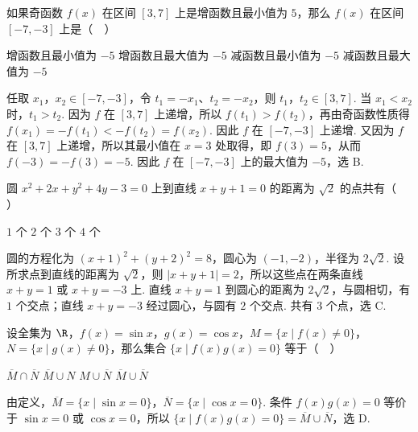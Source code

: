 \begin{problem}
如果奇函数 \(f(x)\) 在区间 \([3,7]\) 上是增函数且最小值为 \(5\)，那么 \(f(x)\) 在区间 \([-7,-3]\) 上是（\(\quad\)）

\choices
    {增函数且最小值为 \(-5\)}
    {增函数且最大值为 \(-5\)}
    {减函数且最小值为 \(-5\)}
    {减函数且最大值为 \(-5\)}


\begin{solution}
任取 \(x_1\)，\(x_2\in[-7,-3]\)，令 \(t_1=-x_1\)、\(t_2=-x_2\)，则 \(t_1\)，\(t_2\in[3,7]\). 当 \(x_1<x_2\) 时，\(t_1>t_2\). 因为 \(f\) 在 \([3,7]\) 上递增，所以 \(f(t_1)>f(t_2)\)，再由奇函数性质得 \(f(x_1)=-f(t_1)<-f(t_2)=f(x_2)\). 因此 \(f\) 在 \([-7,-3]\) 上递增. 又因为 \(f\) 在 \([3,7]\) 上递增，所以其最小值在 \(x=3\) 处取得，即 \(f(3)=5\)，从而 \(f(-3)=-f(3)=-5\). 因此 \(f\) 在 \([-7,-3]\) 上的最大值为 \(-5\)，选 B.
\end{solution}
\end{problem}

\begin{problem}
圆 \(x^{2} + 2x + y^{2} + 4y - 3 = 0\) 上到直线 \(x + y + 1 = 0\) 的距离为 \(\sqrt{2}\) 的点共有（\(\quad\)）

\choices
    {\(1\) 个}
    {\(2\) 个}
    {\(3\) 个}
    {\(4\) 个}


\begin{solution}
圆的方程化为 \(\left(x+1\right)^2+\left(y+2\right)^2=8\)，圆心为 \((-1,-2)\)，半径为 \(2\sqrt2\). 设所求点到直线的距离为 \(\sqrt2\)，则 \(\lvert x+y+1\rvert=2\)，所以这些点在两条直线 \(x+y=1\) 或 \(x+y=-3\) 上. 直线 \(x+y=1\) 到圆心的距离为 \(2\sqrt{2}\)，与圆相切，有 \(1\) 个交点；直线 \(x+y=-3\) 经过圆心，与圆有 \(2\) 个交点. 共有 \(3\) 个点，选 C.
\end{solution}
\end{problem}

\begin{problem}
设全集为 \(\R\)，\(f(x)=\sin x\)，\(g(x)=\cos x\)，\(M=\{x\mid f(x)\neq 0\}\)，\(N=\{x\mid g(x)\neq 0\}\)，那么集合 \(\{x\mid f(x)g(x)=0\}\) 等于（\(\quad\)）

\choices
    {\(\overline{M} \cap \overline{N}\)}
    {\(\overline{M} \cup N\)}
    {\(M \cup \overline{N}\)}
    {\(\overline{M} \cup \overline{N}\)}


\begin{solution}
由定义，\(\overline M=\{x\mid\sin x=0\}\)，\(\overline N=\{x\mid\cos x=0\}\). 条件 \(f(x)g(x)=0\) 等价于 \(\sin x=0\) 或 \(\cos x=0\)，所以 \(\{x\mid f(x)g(x)=0\}=\overline M\cup\overline N\)，选 D.
\end{solution}
\end{problem}

